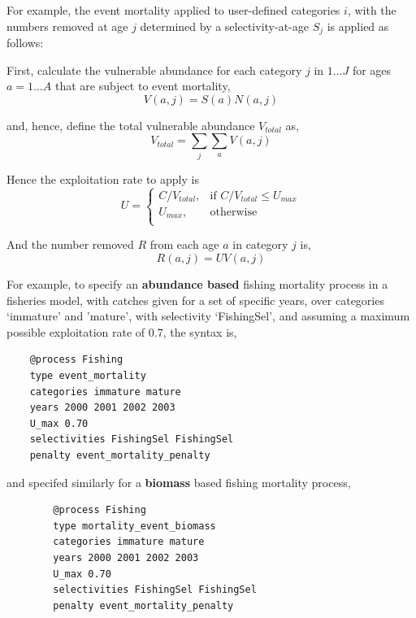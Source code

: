 For example, the event mortality applied to user-defined categories $i$, with the numbers removed at age $j$ determined by a selectivity-at-age $S_j$ is applied as follows:

First, calculate the vulnerable abundance for each category $j$ in $1 \ldots J$ for ages $a = 1 \ldots A$ that are subject to event mortality,
\begin{equation}
  V(a,j) = S(a) N(a,j)
\end{equation}

and, hence, define the total vulnerable abundance $V_{total}$ as,
\begin{equation}
  V_{total}  = \sum\limits_j {\sum\limits_a {V(a,j)}} 
\end{equation}

Hence the exploitation rate to apply is 
\begin{equation}
U = \begin{cases}
  C/V_{total}, & \text{if $C/V_{total} \leq U_{max}$} \\
  U_{max}, & \text{otherwise}\\ 
  \end{cases} 
\end{equation}

And the number removed $R$ from each age $a$ in category $j$ is,
\begin{equation}
  R(a,j) = UV(a,j)
\end{equation}

For example, to specify an \textbf{abundance based} fishing mortality process in a fisheries model, with catches given for a set of specific years, over categories `immature' and 'mature', with selectivity `FishingSel', and assuming a maximum possible exploitation rate of 0.7, the syntax is,

{\small{\begin{verbatim}
	@process Fishing
	type event_mortality
	categories immature mature
	years 2000 2001 2002 2003
	U_max 0.70
	selectivities FishingSel FishingSel
	penalty event_mortality_penalty
	\end{verbatim}}}

and specifed similarly for a \textbf{biomass} based fishing mortality process,

{\small{\begin{verbatim}
		@process Fishing
		type mortality_event_biomass
		categories immature mature
		years 2000 2001 2002 2003
		U_max 0.70
		selectivities FishingSel FishingSel
		penalty event_mortality_penalty
		\end{verbatim}}}

